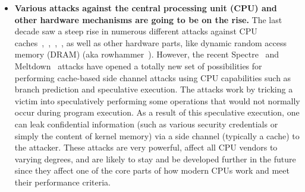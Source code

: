 \begin{itemize}
	\item \textbf{Various attacks against the central processing unit (CPU) and other hardware mechanisms are going to be on the rise.} The last decade saw a steep rise in numerous different attacks against CPU caches~\cite{lipp2016armageddon},~\cite{brasser2017software},~\cite{gras2017aslr},~\cite{irazoqui2017cache}, as well as other hardware parts, like dynamic random access memory (DRAM) (aka rowhammer~\cite{seaborn2015exploiting}). However, the recent Spectre~\cite{Kocher2018spectre} and Meltdown~\cite{Lipp2018meltdown} attacks have opened a totally new set of possibilities for performing cache-based side channel attacks using CPU capabilities such as branch prediction and speculative execution. The attacks work by tricking a victim into speculatively performing some operations that would not normally occur during program execution. As a result of this speculative execution, one can leak confidential information (such as various security credentials or simply the content of kernel memory) via a side channel (typically a cache) to the attacker. These attacks are very powerful, affect all CPU vendors to varying degrees, and are likely to stay and be developed further in the future since they affect one of the core parts of how modern CPUs work and meet their performance criteria. 			


\end{itemize}
